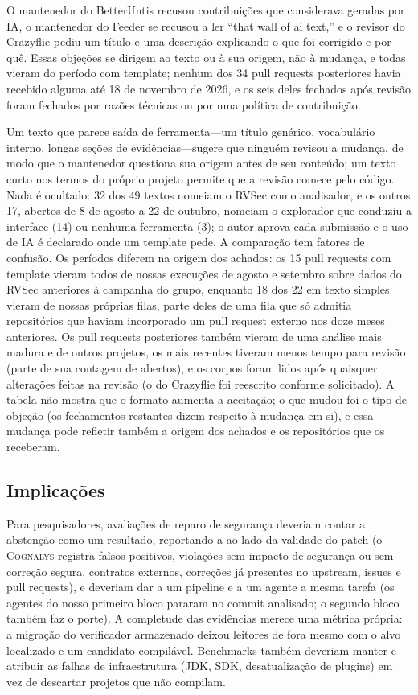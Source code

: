 \documentclass[conference]{IEEEtran}
\newcommand{\system}{\textsc{Cognalys}}
\begin{document}
O mantenedor do
BetterUntis recusou contribuições que considerava geradas por IA, o mantenedor do Feeder
se recusou a ler ``that wall of ai text,'' e o revisor do Crazyflie
pediu um título e uma descrição explicando o que foi corrigido e por quê.
Essas objeções se dirigem ao texto ou à sua origem, não à mudança, e todas vieram
do período com template; nenhum dos 34 pull requests posteriores
havia recebido alguma até 18 de novembro de 2026, e os seis deles fechados após revisão
foram fechados por razões técnicas ou por uma política de contribuição.

Um texto que parece saída de ferramenta---um título genérico, vocabulário interno,
longas seções de evidências---sugere que ninguém revisou a mudança, de modo que o
mantenedor questiona sua origem antes de seu conteúdo; um texto curto nos
termos do próprio projeto permite que a revisão comece pelo código. Nada é ocultado: 32 dos 49
textos nomeiam o RVSec como analisador, e os outros 17, abertos de 8 de agosto a
22 de outubro, nomeiam o explorador que conduziu a interface (14) ou nenhuma
ferramenta (3); o autor aprova cada submissão e o uso de IA é declarado onde um
template pede. A comparação tem fatores de confusão. Os
períodos diferem na origem dos achados: os 15 pull requests com template vieram
todos de nossas execuções de agosto e setembro sobre dados do RVSec anteriores à
campanha do grupo, enquanto 18 dos 22 em texto simples vieram de nossas próprias
filas, parte deles de uma fila que só admitia repositórios que haviam incorporado
um pull request externo nos doze meses anteriores. Os pull requests posteriores
também vieram de uma análise mais madura e de outros projetos, os mais recentes
tiveram menos tempo para revisão (parte de sua contagem de abertos), e os corpos
foram lidos após quaisquer alterações feitas na revisão (o do Crazyflie foi
reescrito conforme solicitado). A tabela não mostra que o formato aumenta a
aceitação; o que mudou foi o tipo de objeção (os fechamentos restantes dizem
respeito à mudança em si), e essa mudança pode refletir também a origem dos
achados e os repositórios que os receberam.

\subsection{Implicações}

Para pesquisadores, avaliações de reparo de segurança deveriam contar a abstenção como um
resultado, reportando-a ao lado da validade do patch (o \system{} registra falsos
positivos, violações sem impacto de segurança ou sem correção segura, contratos
externos, correções já presentes no upstream, issues e pull requests), e deveriam dar
a um pipeline e a um agente a mesma tarefa (os agentes do nosso primeiro bloco pararam no
commit analisado; o segundo bloco também faz o porte). A completude das evidências
merece uma métrica própria: a migração do verificador armazenado deixou leitores de fora mesmo
com o alvo localizado e um candidato compilável. Benchmarks também deveriam
manter e atribuir as falhas de infraestrutura (JDK, SDK, desatualização de plugins) em vez
de descartar projetos que não compilam.
\end{document}
